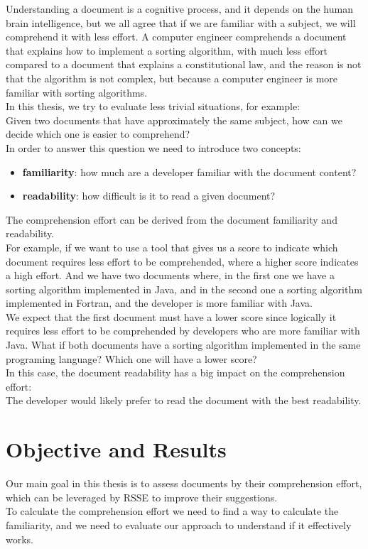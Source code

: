 \documentclass[12pt,mscthesis]{usiinfthesis}
\begin{document}
	Understanding a document is a cognitive process, and it depends on the human brain intelligence, but we all agree that if we are familiar with a subject, we will comprehend it with less effort. A computer engineer comprehends a document that explains how to implement a sorting algorithm, with much less effort compared to a document that explains a constitutional law, and the reason is not that the algorithm is not complex, but because a computer engineer is more familiar with sorting algorithms.\\
	
	In this thesis, we try to evaluate less trivial situations, for example:\\
	Given two documents that have approximately the same subject, how can we decide which one is easier to comprehend?\\
	In order to answer this question we need to introduce two concepts:
	\begin{itemize}
	\item \textbf{familiarity}: how much are a developer familiar with the document content?
	\item \textbf{readability}: how difficult is it to read a given document?
	\end{itemize}
	The comprehension effort can be derived from the document familiarity and readability.\\

	For example, if we want to use a tool that gives us a score to indicate which document requires less effort to be comprehended, where a higher score indicates a high effort. And we have two documents where, in the first one we have a sorting algorithm implemented in Java, and in the second one a sorting algorithm implemented in Fortran, and the developer is more familiar with Java.\\
	We expect that the first document must have a lower score since logically it requires less effort to be comprehended by developers who are more familiar with Java.
	What if both documents have a sorting algorithm implemented in the same programing language? Which one will have a lower score? \\
	In this case, the document readability has a big impact on the comprehension effort:\\
	The developer would likely prefer to read the document with the best readability.\\
	
	\section{Objective and Results}
	Our main goal in this thesis is to assess documents by their comprehension effort, which can be leveraged by RSSE to improve their suggestions.\\
	To calculate the comprehension effort we need to find a way to calculate the familiarity, and we need to evaluate our approach to understand if it effectively works.\\
\end{document}

